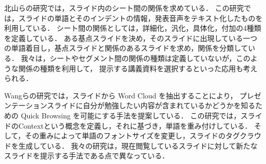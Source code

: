 \documentclass{js}
\begin{document}
北山ら\cite{kitayama2009}の研究では，スライド内のシート間の関係を求めている．
この研究では，スライドの単語とそのインデントの情報，発表音声をテキスト化したものを利用している．
シート間の関係としては，詳細化，汎化，具体化，付加の4種類を定義している．
ある基点スライドを決め，そのスライドに出現している一つの単語着目し，基点スライドと関係のあるスライドを求め，関係を分類している．
我々は，シートやセグメント間の関係の種類は定義していないが，このような関係の種類を利用して，
提示する講義資料を選択するといった応用も考えられる．


Wangら\cite{wang2013}の研究では，スライドから Word Cloud を抽出することにより，
プレゼンテーションスライドに自分が勉強したい内容が含まれているかどうかを知るための
 Quick Browsing を可能にする手法を提案している．
この研究では，スライドのContextという概念を定義し，それに基づき，単語を重み付けしている．
そして，その重みによって単語のフォントサイズを変更し，スライドのタグクラウドを生成している．
我々の研究は，現在閲覧しているスライドに対して新たなスライドを提示する手法である点で異なっている．
\end{document}

